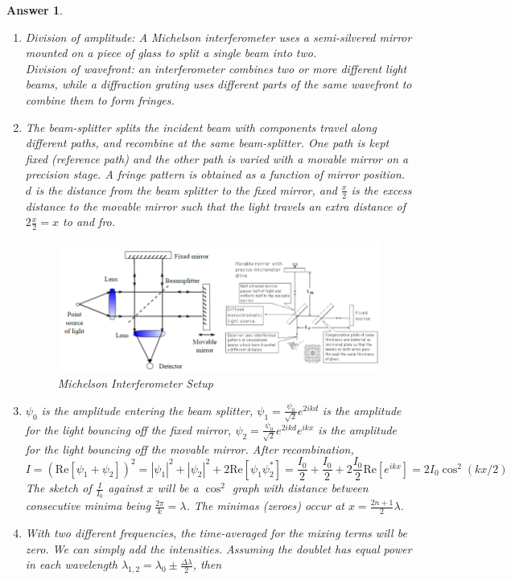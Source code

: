 \documentclass[a4paper]{article}
\newtheorem{ans}{Answer}[subsection]
\theoremstyle{new}
\begin{document}
\begin{ans}\leavevmode
\begin{enumerate}[label=(\alph*)]
\item Division of amplitude: A Michelson interferometer uses a semi-silvered mirror mounted on a piece of glass to split a single beam into two.\\[5pt]
Division of wavefront: an interferometer combines two or more different light beams, while a diffraction grating uses different parts of the same wavefront to combine them to form fringes.
\item The beam-splitter splits the incident beam with components travel along different paths, and recombine at the same beam-splitter. One path is kept fixed (reference path) and the other path is varied with a movable mirror on a precision stage. A fringe pattern is obtained as a function of mirror position. $d$ is the distance from the beam splitter to the fixed mirror, and $\frac{x}{2}$ is the excess distance to the movable mirror such that the light travels an extra distance of $2\frac{x}{2}=x$ to and fro.
\begin{figure}[H]
    \centering
    \includegraphics[width=\linewidth]{mmi.PNG}
    \caption{Michelson Interferometer Setup}
    \label{fig:my_label}
\end{figure}
\item $\psi_0$ is the amplitude entering the beam splitter, $\psi_1=\frac{\psi_0}{\sqrt{2}}e^{2ikd}$ is the amplitude for the light bouncing off the fixed mirror, $\psi_2=\frac{\psi_0}{\sqrt{2}}e^{2ikd}e^{ikx}$ is the amplitude for the light bouncing off the movable mirror. After recombination,
$$I=(\text{Re}[\psi_1+\psi_2])^2=|\psi_1|^2+|\psi_2|^2+2\text{Re}[\psi_1\psi_2^*]=\frac{I_0}{2}+\frac{I_0}{2}+2\frac{I_0}{2}\text{Re}[e^{ikx}]=2I_0\cos^2(kx/2)$$
The sketch of $\frac{I}{I_0}$ against $x$ will be a $\cos^2$ graph with distance between consecutive minima being $\frac{2\pi}{k}=\lambda$. The minimas (zeroes) occur at $x=\frac{2n+1}{2}\lambda$.
\item With two different frequencies, the time-averaged for the mixing terms will be zero. We can simply add the intensities. Assuming the doublet has equal power in each wavelength $\lambda_{1,2}=\lambda_0\pm\frac{\Delta\lambda}{2}$, then

\end{enumerate}
\end{ans}
\end{document}
